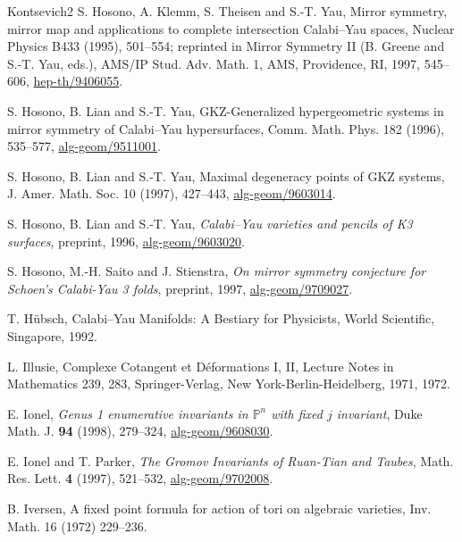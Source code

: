 \begin{thebibliography}{Kontsevich2}
\hypertarget{bib:HKTY2}{}
S. Hosono, A. Klemm, S. Theisen and S.-T. Yau,
Mirror symmetry, mirror map and applications to complete intersection
Calabi--Yau spaces, Nuclear Physics B433 (1995), 501--554;
reprinted in Mirror Symmetry II (B. Greene and S.-T. Yau, eds.),
AMS/IP Stud. Adv. Math. 1, AMS, Providence, RI, 1997, 545--606,
\href{https://arxiv.org/abs/hep-th/9406055}{hep-th/9406055}.

\hypertarget{bib:HLY1}{}
S. Hosono, B. Lian and S.-T. Yau, GKZ-Generalized hypergeometric systems in mirror symmetry of Calabi--Yau hypersurfaces, Comm. Math. Phys. 182 (1996), 535--577, \href{https://arxiv.org/abs/alg-geom/9511001}{alg-geom/9511001}.

\hypertarget{bib:HLY2}{}
S. Hosono, B. Lian and S.-T. Yau, Maximal degeneracy points of GKZ systems, J. Amer. Math. Soc. 10 (1997), 427--443, \href{https://arxiv.org/abs/alg-geom/9603014}{alg-geom/9603014}.

\hypertarget{bib:HLY3}{} S. Hosono, B. Lian and S.-T. Yau, \emph{Calabi--Yau varieties and pencils of K3 surfaces}, preprint, 1996, \href{https://arxiv.org/abs/alg-geom/9603020}{alg-geom/9603020}.

\hypertarget{bib:HSS}{} S. Hosono, M.-H. Saito and J. Stienstra, \emph{On mirror symmetry conjecture for Schoen's Calabi-Yau 3 folds}, preprint, 1997, \href{https://arxiv.org/abs/alg-geom/9709027}{alg-geom/9709027}.

\hypertarget{bib:Huebsch}{}
T. Hübsch, Calabi--Yau Manifolds: A Bestiary for Physicists,
World Scientific, Singapore, 1992.

\hypertarget{bib:Illusie}{}
L. Illusie, Complexe Cotangent et Déformations I, II, Lecture Notes in Mathematics 239, 283, Springer-Verlag, New York-Berlin-Heidelberg, 1971, 1972.

\hypertarget{bib:Ionel}{} E. Ionel, \emph{Genus 1 enumerative invariants in $\mathbb P^n$ with fixed $j$ invariant}, Duke Math. J. \textbf{94} (1998), 279--324, \href{https://arxiv.org/abs/alg-geom/9608030}{alg-geom/9608030}.

\hypertarget{bib:IP}{} E. Ionel and T. Parker, \emph{The Gromov Invariants of Ruan-Tian and Taubes}, Math. Res. Lett. \textbf{4} (1997), 521--532, \href{https://arxiv.org/abs/alg-geom/9702008}{alg-geom/9702008}.

\hypertarget{bib:Iversen}{}
B. Iversen, A fixed point formula for action of tori on algebraic varieties, Inv. Math. 16 (1972) 229--236.


\end{thebibliography}
